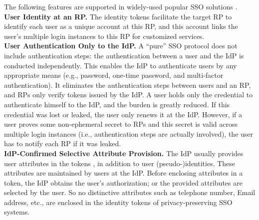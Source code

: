 The following features are supported in widely-used popular SSO solutions \cite{NIST2017draft,OpenIDConnect,rfc6749,SAML,SAMLIdentifier}.
\\\textbf{User Identity at an RP.}
The identity tokens facilitate the target RP to identify each user as a unique account at this RP,
    and this account links the user's multiple login instances to this RP
        for customized services.
\\\textbf{User Authentication Only to the IdP.}
A ``pure'' SSO protocol  \cite{OpenIDConnect,rfc6749,SAML} does not include authentication steps:
    the authentication between a user and the IdP is conducted independently.
This
    enables the IdP to authenticate users by any appropriate means (e.g., password,
one-time password, and multi-factor authentication).
It eliminates the authentication steps between users and an RP,
        and RPs only verify tokens issued by the IdP.
A user holds only the credential to authenticate himself to the IdP,
    and the burden is greatly reduced.
If this credential was lost or leaked,
    the user only renews it at the IdP.
However, if a user proves some non-ephemeral secret to RPs and this secret is valid across multiple login instances
    (i.e., authentication steps are actually involved),
                the user has to notify each RP if it was leaked. %
\\\textbf{IdP-Confirmed Selective Attribute Provision.}
The IdP usually provides user attributes in the tokens \cite{OpenIDConnect,rfc6749,SAML},
    in addition to user (pseudo-)identities.
These attributes are maintained by users at the IdP.
Before enclosing attributes in a token,
    the IdP obtains the user's authorization;
    or the provided attributes are selected by the user.
So no distinctive attributes such as telephone number, Email address, etc.,
        are enclosed in the identity tokens of privacy-preserving SSO systems.

%

